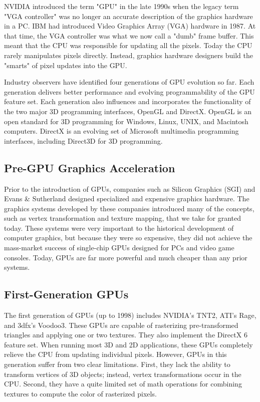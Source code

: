\documentclass[../main.tex]{subfiles}
\begin{document}
NVIDIA introduced the term "GPU" in the late 1990s when the legacy term "VGA controller" was no longer an accurate description of the graphics hardware in a PC. IBM had introduced Video Graphics Array (VGA) hardware in 1987. At that time, the VGA controller was what we now call a "dumb" frame buffer. This meant that the CPU was responsible for updating all the pixels. Today the CPU rarely manipulates pixels directly. Instead, graphics hardware designers build the "smarts" of pixel updates into the GPU.

Industry observers have identified four generations of GPU evolution so far. Each generation delivers better performance and evolving programmability of the GPU feature set. Each generation also influences and incorporates the functionality of the two major 3D programming interfaces, OpenGL and DirectX. OpenGL is an open standard for 3D programming for Windows, Linux, UNIX, and Macintosh computers. DirectX is an evolving set of Microsoft multimedia programming interfaces, including Direct3D for 3D programming.

\subsection*{Pre-GPU Graphics Acceleration}

Prior to the introduction of GPUs, companies such as Silicon Graphics (SGI) and Evans \& Sutherland designed specialized and expensive graphics hardware. The graphics systems developed by these companies introduced many of the concepts, such as vertex transformation and texture mapping, that we take for granted today. These systems were very important to the historical development of computer graphics, but because they were so expensive, they did not achieve the mass-market success of single-chip GPUs designed for PCs and video game consoles. Today, GPUs are far more powerful and much cheaper than any prior systems.

\subsection*{First-Generation GPUs}

The first generation of GPUs (up to 1998) includes NVIDIA's TNT2, ATI's Rage, and 3dfx's Voodoo3. These GPUs are capable of rasterizing pre-transformed triangles and applying one or two textures. They also implement the DirectX 6 feature set. When running most 3D and 2D applications, these GPUs completely relieve the CPU from updating individual pixels. However, GPUs in this generation suffer from two clear limitations. First, they lack the ability to transform vertices of 3D objects; instead, vertex transformations occur in the CPU. Second, they have a quite limited set of math operations for combining textures to compute the color of rasterized pixels.
\end{document}
